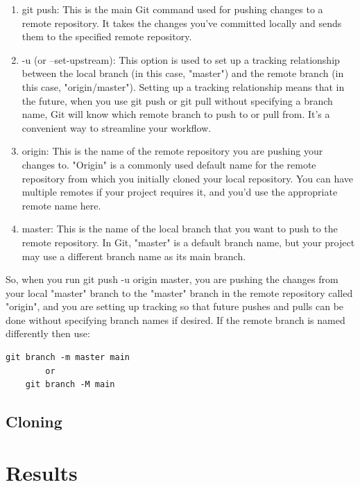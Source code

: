 \documentclass[12pt]{report} %
\begin{document}
\begin{enumerate}
	\item git push: This is the main Git command used for pushing changes to a remote repository. It takes the changes you've committed locally and sends them to the specified remote repository.

	\item -u (or --set-upstream): This option is used to set up a tracking relationship between the local branch (in this case, "master") and the remote branch (in this case, "origin/master"). Setting up a tracking relationship means that in the future, when you use git push or git pull without specifying a branch name, Git will know which remote branch to push to or pull from. It's a convenient way to streamline your workflow.
	
	\item origin: This is the name of the remote repository you are pushing your changes to. "Origin" is a commonly used default name for the remote repository from which you initially cloned your local repository. You can have multiple remotes if your project requires it, and you'd use the appropriate remote name here.
	
	\item master: This is the name of the local branch that you want to push to the remote repository. In Git, "master" is a default branch name, but your project may use a different branch name as its main branch.
\end{enumerate}

So, when you run git push -u origin master, you are pushing the changes from your local "master" branch to the "master" branch in the remote repository called "origin", and you are setting up tracking so that future pushes and pulls can be done without specifying branch names if desired. 
If the remote branch is named differently then use:


\begin{lstlisting}[caption={Branch Name Change},captionpos=b,label=lst:nameChange]
	git branch -m master main
		or
	git branch -M main
\end{lstlisting}


\section{Cloning}


\chapter{Results} 
\end{document}
